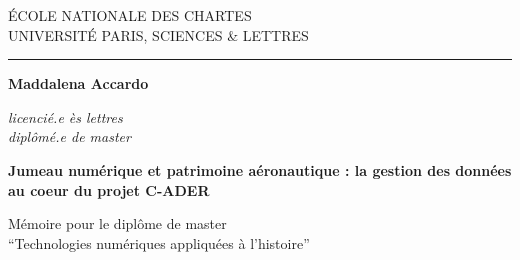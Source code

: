 \begin{titlepage}
    \begin{center}
        \bigskip
        
        \begin{large}                
            ÉCOLE NATIONALE DES CHARTES\\
            UNIVERSITÉ PARIS, SCIENCES \& LETTRES
        \end{large}
        \begin{center}\rule{2cm}{0.02cm}\end{center}
        
        \bigskip
        \bigskip
        \bigskip
        \begin{Large}
            \textbf{Maddalena Accardo}\\
        \end{Large}
        
        \begin{normalsize} 
            \textit{licencié.e ès lettres}\\
            \textit{diplômé.e de master} 
        \end{normalsize}
        
        \bigskip
        \bigskip
        \bigskip
        
        \begin{Huge}
            \textbf{Jumeau numérique et patrimoine aéronautique : la gestion des données au coeur du projet C-ADER}\\
        \end{Huge}
        \bigskip
        \bigskip
        
        \vfill
        
        \begin{large}
            Mémoire 
            pour le diplôme de master \\
            \enquote{Technologies numériques appliquées à l'histoire} \\
        \end{large}
    \end{center}
\end{titlepage}